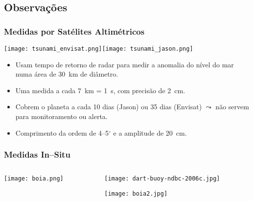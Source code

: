 \documentclass{beamer}
\begin{document}
\subsection{Observações}
\begin{frame}
  \frametitle{Medidas por Satélites Altimétricos}
  \centerline{\texttt{[image: tsunami\_envisat.png]}\texttt{[image: tsunami\_jason.png]}}
  \begin{itemize}\setlength{\itemsep}{1ex}
  \item Usam tempo de retorno de radar para medir a anomalia do nível do mar numa área de 30~km de diâmetro.
  \item Uma medida a cada 7~km = 1~s, \alert{com precisão de 2~cm}.
  \item Cobrem o planeta a cada 10 dias (Jason) ou 35 dias (Envisat) $\leadsto$ não servem para monitoramento ou alerta.
  \item \alert{Comprimento da ordem de 4--5$^\circ$ e a amplitude de 20~cm.}
  \end{itemize}
\end{frame}
\begin{frame}
  \frametitle{Medidas In--Situ}
  \begin{columns}
    \begin{column}{0.58\paperwidth}
      \centerline{\texttt{[image: boia.png]}}
    \end{column}
    \hspace{0.01\paperwidth}
    \begin{column}{0.25\paperwidth}
      \centerline{\texttt{[image: dart-buoy-ndbc-2006c.jpg]}}

      \centerline{\texttt{[image: boia2.jpg]}}
    \end{column}
  \end{columns}
\bigskip
\end{frame}
\end{document}
